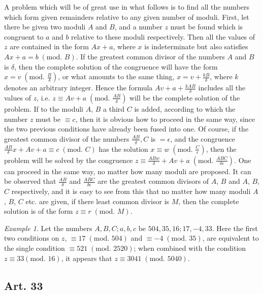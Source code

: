\documentclass{book}
\theoremstyle{plain}
\theoremstyle{remark}
\newtheorem*{example}{Example}
\begin{document}
A problem which will be of great use in what follows is to find all the numbers which form given remainders relative to any given number of moduli.  First, let there be given two moduli $A$ and $B$, and a number $z$ must be found which is congruent to $a$ and $b$ relative to these moduli respectively.  Then all the values of $z$ are contained in the form $Ax + a$, where $x$ is indeterminate but also satisfies $Ax + a = b \;(\textrm{mod. }B)$.  If the greatest common divisor of the numbers $A$ and $B$ is $\delta$, then the complete solution of the congruence will have the form $x=v \;(\textrm{mod. }\frac{B}{\delta})$, or what amounts to the same thing, $x=v+\frac{kB}{\delta}$, where $k$ denotes an arbitrary integer.   Hence the formula $Av + a + \frac{kAB}{\delta}$ includes all the values of $z$, i.e. $z \equiv Av + a \; (\textrm{mod. }\frac{AB}{\delta})$ will be the complete solution of the problem.  If to the moduli $A$, $B$ a third $C$ is added, according to which the number $z$ must be $\equiv c$, then it is obvious how to proceed in the same way, since the two previous conditions have already been fused into one.  Of course, if the greatest common divisor of the numbers $\frac{AB}{\delta},  C$ is $=\epsilon$, and the congruence $\frac{AB}{\delta}x + Av + a \equiv c\;(\textrm{mod. }C)$ has the solution $x \equiv w \;(\textrm{mod. }\frac{C}{\epsilon})$, then the problem will be solved by the congruence $z \equiv \frac{ABw}{\delta} + Av + a \;(\textrm{mod. }\frac{ABC}{\delta \epsilon})$.  One can proceed in the same way, no matter how many moduli are proposed.  It can be observed that $\frac{AB}{\delta}$ and $\frac{ABC}{\delta \epsilon}$ are the greatest common divisors of $A$, $B$ and $A$, $B$, $C$ respectively, and it is easy to see from this that no matter how many moduli $A$, $B$, $C$ etc. are given, if there least common divisor is $M$, then the complete solution is of the form $z \equiv r \;(\textrm{mod. } M)$.

\begin{example} Let the numbers $A,B,C;a,b,c$ be $504,35,16;17,-4,33$.  Here the first two conditions on $z$, $\equiv 17\;(\textrm{mod. }504)$ and $\equiv -4 \;(\textrm{mod. }35)$, are equivalent to the single condition $\equiv 521\;(\textrm{mod. }2520)$;  when combined with the condition $z \equiv 33(\textrm{mod. } 16)$, it appears that $z \equiv 3041\;(\textrm{mod. }5040)$. \end{example}

\subsection*{Art. 33} 
\end{document}
